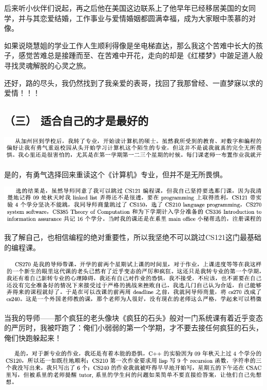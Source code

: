 \documentclass[9pt, b5paper]{article}
\begin{document}
后来听小伙伴们说起，再之后他在美国这边联系上了他早年已经移居美国的女同学，并与其恋爱结婚，工作事业与爱情婚姻都圆满幸福，成为大家眼中羡慕的对像。 

如果说晓慧姐的学业工作人生顺利得像是坐电梯直达，那么我这个苦难中长大的孩子，感觉苦难总是接踵而至、在苦难中开花，走向的却是《红楼梦》中跛足道人般寻找灵魂解脱的心灵之旅。

还好，路的尽头，我仍然找到了我亲爱的表哥，找回了我那曾经、一直梦寐以求的爱情！！！

\subsection{（三） 适合自己的才是最好的}
\label{sec:orga08a06d}

\begin{center}
\includegraphics[width=.9\linewidth]{./pic/backups_plans_20210425_112131.png}
\end{center}

是的，有勇气选择回来重读这个《计算机》专业，但并不是无所畏惧。

\begin{center}
\includegraphics[width=.9\linewidth]{./pic/backups_plans_20210424_203000.png}
\end{center}

我了解自己，也相信编程的绝对重要性，所以我坚绝不可以跳过CS121这门最基础的编程课。

\begin{center}
\includegraphics[width=.9\linewidth]{./pic/backups_plans_20210424_203059.png}
\end{center}

当我的导师——那个疯狂的老头像块《疯狂的石头》般对一门系统课有着近乎变态的严厉时，我被吓跑了：俺们小弱弱的第一个学期，才不要去接任何疯狂的石头，俺们快跑躲起来！

\begin{center}
\includegraphics[width=.9\linewidth]{./pic/backups_plans_20210424_203308.png}
\end{center}
\end{document}
